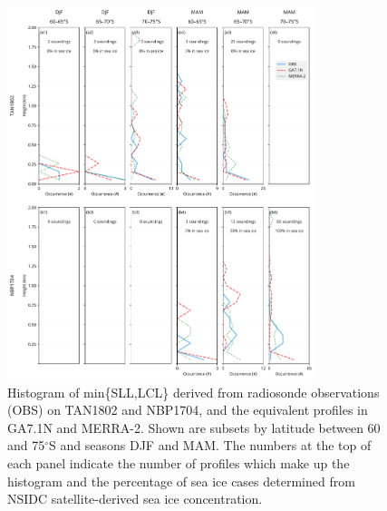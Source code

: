 \clearpage
\begin{figure}[t]
\centering
\includegraphics[width=0.8\textwidth]{chapter2/fig/sst_lifting_level_panel_rev2.pdf}
\caption[Histogram of min\{SLL,LCL\}]{
Histogram of min\{SLL,LCL\} derived from radiosonde observations (OBS) on
TAN1802 and NBP1704, and the equivalent profiles in GA7.1N and MERRA-2.  Shown
are subsets by latitude between 60 and 75$^\circ$S and seasons DJF and MAM.
The numbers at the top of each panel indicate the number of profiles which make
up the histogram and the percentage of sea ice cases determined from NSIDC
satellite-derived sea ice concentration.
}
\label{fig:sll-distribution}
\end{figure}

